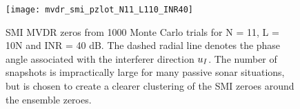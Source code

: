 
\begin{figure}[!hp]
  \centering
  \texttt{[image: mvdr\_smi\_pzlot\_N11\_L110\_INR40]}
  \caption{SMI MVDR zeros from 1000 Monte Carlo trials for N = 11, L =
    10N and INR = 40 dB. The dashed radial line denotes the phase
    angle associated with the interferer direction $u_I$. The
    number of snapshots is impractically large for many passive sonar
    situations, but is chosen to create a clearer clustering of the
    SMI zeroes around the ensemble zeroes.}
  \label{fig:smi-mvdr-pzplot}
\end{figure}

